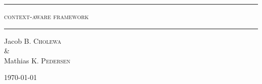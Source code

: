 \begin{titlepage}
\begin{center}

\vspace{2cm}

\rule{\linewidth}{0.6mm}

\textsc{\LARGE context-aware framework}
\vspace{0.2cm}
\rule{\linewidth}{0.4mm}

Jacob B. \textsc{Cholewa}
\\ \& \\
Mathias K. \textsc{Pedersen}

\vfill

\large \today
\end{center}


\end{titlepage}